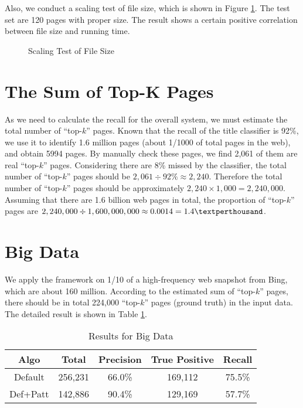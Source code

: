 Also, we conduct a scaling test of file size,
which is shown in Figure \ref{fig:FileSize}.
The test set are 120 pages with proper size.
The result shows a certain positive correlation between file size and running time.

\begin{figure}[th]
	\centering
	\caption{Scaling Test of File Size}
	\label{fig:FileSize}
\end{figure}



\section{The Sum of Top-K Pages }
\label{sec:topKSum}
As we need to calculate the recall for the overall system, we must estimate the total number of ``top-$k$'' pages.
Known that the recall of the title classifier is 92\%, we use it to identify 1.6 million pages (about 1/1000 of total pages in the web), and obtain 5994 pages.
By manually check these pages, we find 2,061 of them are real ``top-$k$'' pages. Considering there are 8\% missed by the classifier, the total number of ``top-$k$'' pages should be $2,061\div92\%\approx2,240$. Therefore the total number of ``top-$k$'' pages should be approximately $2,240\times1,000=2,240,000$.
Assuming that there are 1.6 billion web pages in total, the proportion of ``top-$k$'' pages are $2,240,000 \div 1,600,000,000\approx0.0014=1.4\textperthousand$.

\section{Big Data}
We apply the framework on 1/10 of a high-frequency web snapshot from Bing,
which are about 160 million.
According to the estimated sum of ``top-$k$'' pages,
there should be in total 224,000 ``top-$k$'' pages (ground truth)
in the input data. The detailed result is shown in Table \ref{tab:cosmosRes}.

\begin{table}
\centering
\begin{tabular}{|c||c|c|c|c|}
\hline
Algo & Total & Precision & True Positive & Recall\\\hline
Default & 256,231 & 66.0\% & 169,112 & 75.5\% \\
Def+Patt& 142,886 & 90.4\% & 129,169 & 57.7\% \\
\hline
\end{tabular}
\caption{Results for Big Data}
\label{tab:cosmosRes}
\vspace*{-10pt}
\end{table}


